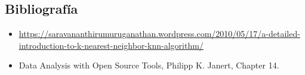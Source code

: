 \subsection{Bibliografía}

\begin{itemize}
 \item \href{A Detailed Introduction to K-Nearest Neighbor (KNN) Algorithm}{https://saravananthirumuruganathan.wordpress.com/2010/05/17/a-detailed-introduction-to-k-nearest-neighbor-knn-algorithm/}
  \item Data Analysis with Open Source Tools, Philipp K. Janert, Chapter 14.
\end{itemize}

